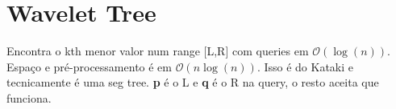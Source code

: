     \section{Wavelet Tree}
    Encontra o kth menor valor num range [L,R] com queries em $\mathcal{O}(\log(n))$. Espaço e pré-processamento é em $\mathcal{O}(n \log(n))$. Isso é do Kataki e tecnicamente é uma seg tree. \textbf{p} é o L e \textbf{q} é o R na query, o resto aceita que funciona.
